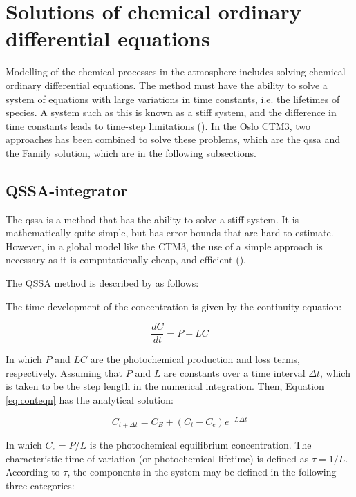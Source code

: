 \section{Solutions of chemical ordinary differential equations}

Modelling of the chemical processes in the atmosphere includes solving chemical ordinary differential equations. The method must have the ability to solve a system of equations with large variations in time constants, i.e. the lifetimes of species. A system such as this is known as a stiff system, and the difference in time constants leads to time-step limitations (\cite{AtmModFund}). In the Oslo CTM3, two approaches has been combined to solve these problems, which are the \acrfull{qssa} and the Family solution, which are in the following subsections. 

\subsection{QSSA-integrator}\label{sec:QSSA}

The \acrshort{qssa} is a method that has the ability to solve a stiff system. It is mathematically quite simple, but has error bounds that are hard to estimate. However, in a global model like the CTM3, the use of a simple approach is necessary as it is computationally cheap, and efficient (\cite{Hesstvedt1978}). 

\medskip

The QSSA method is described by \cite{Hesstvedt1978} as follows: 

\medskip

The time development of the concentration is given by the continuity equation:

\begin{equation}
    \frac{dC}{dt} = P - LC
    \label{eq:conteqn}
\end{equation}

In which $P$ and $LC$ are the photochemical production and loss terms, respectively. Assuming that $P$ and $L$ are constants over a time interval $\Delta t$, which is taken to be the step length in the numerical integration. Then, Equation \ref{eq:conteqn} has the analytical solution: 

\begin{equation}
    C_{t + \Delta t} = C_{E} + (C_{t} - C_{e})e^{-L\Delta t}
    \label{eq:analyt_soltn}
\end{equation}

In which $C_{e} = P/L$ is the photochemical equilibrium concentration. The characteristic time of variation (or photochemical lifetime) is defined as $\tau = 1/L$. According to $\tau$, the components in the system may be defined in the following three categories: 

